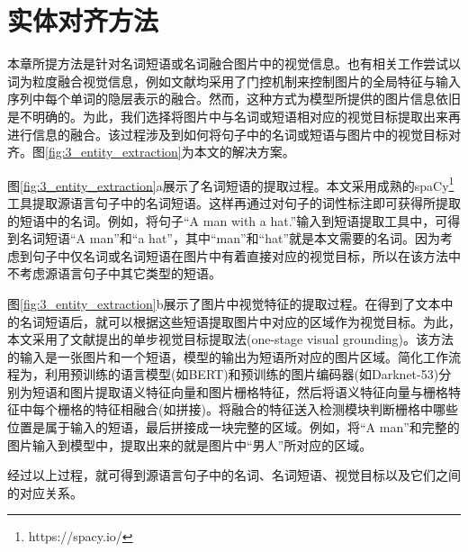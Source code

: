 \section{实体对齐方法}
\label{sec:3_entity_extraction}
本章所提方法是针对名词短语或名词融合图片中的视觉信息。也有相关工作尝试以词为粒度融合视觉信息，例如文献\cite{20_wu-etal-2021-good,22_li-etal-2021-vision}均采用了门控机制来控制图片的全局特征与输入序列中每个单词的隐层表示的融合。然而，这种方式为模型所提供的图片信息依旧是不明确的。为此，我们选择将图片中与名词或短语相对应的视觉目标提取出来再进行信息的融合。该过程涉及到如何将句子中的名词或短语与图片中的视觉目标对齐。图\ref{fig:3_entity_extraction}为本文的解决方案。


图\ref{fig:3_entity_extraction}a展示了名词短语的提取过程。本文采用成熟的spaCy\footnote{https://spacy.io/}工具提取源语言句子中的名词短语。这样再通过对句子的词性标注即可获得所提取的短语中的名词。例如，将句子“A man with a hat.”输入到短语提取工具中，可得到名词短语“A man”和“a hat”，其中“man”和“hat”就是本文需要的名词。因为考虑到句子中仅名词或名词短语在图片中有着直接对应的视觉目标，所以在该方法中不考虑源语言句子中其它类型的短语。

图\ref{fig:3_entity_extraction}b展示了图片中视觉特征的提取过程。在得到了文本中的名词短语后，就可以根据这些短语提取图片中对应的区域作为视觉目标。为此，本文采用了文献\cite{24_DBLP:conf/iccv/YangGWHYL19}提出的单步视觉目标提取法(one-stage visual grounding)。该方法的输入是一张图片和一个短语，模型的输出为短语所对应的图片区域。简化工作流程为，利用预训练的语言模型(如BERT\cite{25_DBLP:conf/naacl/DevlinCLT19})和预训练的图片编码器(如Darknet-53\cite{26_DBLP:journals/corr/abs-1804-02767})分别为短语和图片提取语义特征向量和图片栅格特征，然后将语义特征向量与栅格特征中每个栅格的特征相融合(如拼接)。将融合的特征送入检测模块判断栅格中哪些位置是属于输入的短语，最后拼接成一块完整的区域。例如，将“A man”和完整的图片输入到模型中，提取出来的就是图片中“男人”所对应的区域。

经过以上过程，就可得到源语言句子中的名词、名词短语、视觉目标以及它们之间的对应关系。